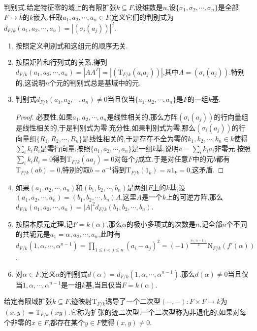 判别式.给定特征零的域上的有限扩张$k\subseteq F$,设维数是$n$,设$\{\sigma_1,\sigma_2,\cdots,\sigma_n\}$是全部$F\to\overline{k}$的$k$嵌入.任取$a_1,a_2,\cdots,a_n\in F$,定义它们的判别式为$d_{F/k}(a_1,a_2,\cdots,a_n)=|(\sigma_i(a_j))|^2$.
\begin{enumerate}
	\item 按照定义判别式和这组元的顺序无关.
	\item 按照矩阵和行列式的关系,得到$d_{F/k}(a_1,a_2,\cdots,a_n)=|AA^T|=|(\mathrm{T}_{F/k}(a_ia_j))|$,其中$A=(\sigma_i(a_j))$.特别的,这说明$n$个元的判别式总是基域中的元.
	\item 判别式$d_{F/k}(a_1,a_2,\cdots,a_n)\not=0$当且仅当$\{a_1,a_2,\cdots,a_n\}$是$F$的一组$k$基.
	\begin{proof}
		
		必要性,如果$a_1,a_2,\cdots,a_n$是线性相关的,那么方阵$(\sigma_i(a_j))$的行向量组是线性相关的,于是判别式为零.充分性,如果判别式为零,那么$(\sigma_i(a_j))$的行向量组$\{R_1,R_2,\cdots,R_n\}$是线性相关的,于是存在不全为零的$k_1,k_2,\cdots,k_n\in k$使得$\sum_ik_iR_i$是零行向量.按照$\{a_1,a_2,\cdots,a_n\}$是一组$k$基,说明$a=\sum_ik_ia_i$非零元.按照$\sum_ik_iR_i=0$得到$\mathrm{T}_{F/k}(aa_j)=0$对每个$j$成立.于是对任意$F$中的元$b$都有$\mathrm{T}_{F/k}(ab)=0$,特别的取$b=a^{-1}$得到$\mathrm{T}_{F/k}(1_k)=n1_k=0$,这矛盾.
	\end{proof}
    \item 如果$(a_1,a_2,\cdots,a_n)$和$(b_1,b_2,\cdots,b_n)$是两组$F$上的$k$基,设$(a_1,a_2,\cdots,a_n)=(b_1,b_2,\cdots,b_n)A$,这里$A$是一个$k$上的可逆方阵,那么$d_{F/k}(a_1,a_2,\cdots,a_n)=|A|^2d_{F/k}(b_1,b_2,\cdots,b_n)$.
    \item 按照本原元定理,记$F=k(\alpha)$,那么$\alpha$的极小多项式的次数是$n$,记全部$n$个不同的共轭元是$a_1=\alpha,a_2,\cdots,a_n$,此时有$d_{F/k}(1,\alpha,\cdots,\alpha^{n-1})=\prod_{1\le i<j\le n}(a_i-a_j)^2=(-1)^{\frac{n(n-1)}{2}}\mathrm{N}_{F/k}(f'(\alpha))$.
    \item 对$\alpha\in F$,定义$\alpha$的判别式$d(\alpha)=d_{F/k}(1,\alpha,\cdots,\alpha^{n-1})$.那么$d(\alpha)\not=0$当且仅当$1,\alpha,\cdots,\alpha^{n-1}$是一组$k$基,当且仅当$F=k(\alpha)$.
\end{enumerate}

给定有限域扩张$k\subseteq F$,迹映射$\mathrm{T}_{F/k}$诱导了一个二次型$(-,-):F\times F\to k$为$(x,y)=\mathrm{T}_{F/k}(xy)$.它称为扩张的迹二次型.一个二次型称为非退化的,如果对每个非零的$x\in F$,都存在某个$y\in F$使得$(x,y)\not=0$.

